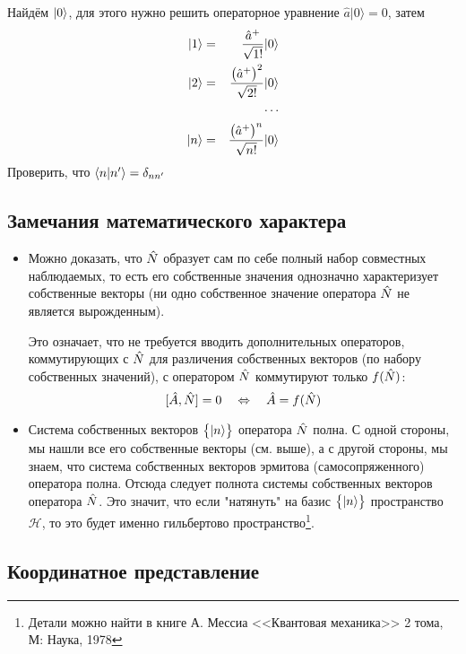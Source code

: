 \Ans Найдём $| 0 \rangle$, для этого нужно решить операторное уравнение $\hat{ a}|0\rangle=0$, затем
\begin{eqnarray*}
    | 1 \rangle &=& \dfrac{\Hat a^+}{\sqrt{1!}} | 0 \rangle\\
    | 2 \rangle &=& \dfrac{\big(\Hat a^+\big)^2}{\sqrt{2!}} | 0 \rangle\\
    && \cdots\\
    | n \rangle &=& \dfrac{\big(\Hat a^+\big)^n}{\sqrt{n!}} | 0 \rangle\\
\end{eqnarray*}
\Exercise Проверить, что $\langle n | n' \rangle = \delta_{nn'}$
\subsection{Замечания математического характера}
\begin{itemize}
  \item Можно доказать, что $\Hat N$ образует сам по себе полный набор совместных наблюдаемых, то есть его собственные значения однозначно характеризует собственные векторы (ни одно собственное значение оператора $\Hat N$ не является вырожденным).

      Это означает, что не требуется вводить дополнительных операторов, коммутирующих с $\Hat N$ для различения собственных векторов (по набору собственных значений), с оператором $\Hat N$ коммутируют только $f(\Hat N)$:
      $$
        [\Hat A, \Hat N] = 0 \quad \Leftrightarrow \quad \Hat A = f(\Hat N)      $$
  \item Система собственных векторов $\big\{ | n \rangle \big\}$ оператора $\Hat N$ полна. С одной стороны, мы нашли все его собственные векторы (см. выше), а с другой стороны, мы знаем, что система собственных векторов эрмитова (самосопряженного) оператора полна. Отсюда следует полнота системы собственных векторов оператора $\Hat N$. Это значит, что если "натянуть" на базис $\big\{ | n \rangle \big\}$ пространство $\mathcal{H}$, то это будет именно гильбертово пространство\footnote{Детали можно найти в книге А. Мессиа <<Квантовая механика>> 2 тома, М: Наука, 1978}.
\end{itemize}

\subsection{Координатное представление}

